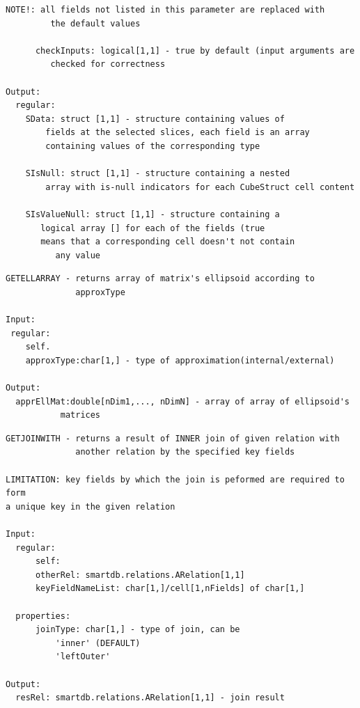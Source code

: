 \documentclass[letterpaper,10pt,english]{sphinxmanual}
\begin{document}
\begin{Verbatim}[commandchars=\\\{\}]
         NOTE!: all fields not listed in this parameter are replaced with
         the default values

      checkInputs: logical[1,1] - true by default (input arguments are
         checked for correctness

Output:
  regular:
    SData: struct [1,1] - structure containing values of
        fields at the selected slices, each field is an array
        containing values of the corresponding type

    SIsNull: struct [1,1] - structure containing a nested
        array with is-null indicators for each CubeStruct cell content

    SIsValueNull: struct [1,1] - structure containing a
       logical array [] for each of the fields (true
       means that a corresponding cell doesn't not contain
          any value
\end{Verbatim}

\begin{Verbatim}[commandchars=\\\{\}]
GETELLARRAY - returns array of matrix's ellipsoid according to
              approxType

Input:
 regular:
    self.
    approxType:char[1,] - type of approximation(internal/external)

Output:
  apprEllMat:double[nDim1,..., nDimN] - array of array of ellipsoid's
           matrices
\end{Verbatim}

\begin{Verbatim}[commandchars=\\\{\}]
GETJOINWITH - returns a result of INNER join of given relation with
              another relation by the specified key fields

LIMITATION: key fields by which the join is peformed are required to form
a unique key in the given relation

Input:
  regular:
      self:
      otherRel: smartdb.relations.ARelation[1,1]
      keyFieldNameList: char[1,]/cell[1,nFields] of char[1,]

  properties:
      joinType: char[1,] - type of join, can be
          'inner' (DEFAULT)
          'leftOuter'

Output:
  resRel: smartdb.relations.ARelation[1,1] - join result
\end{Verbatim}
\end{document}

